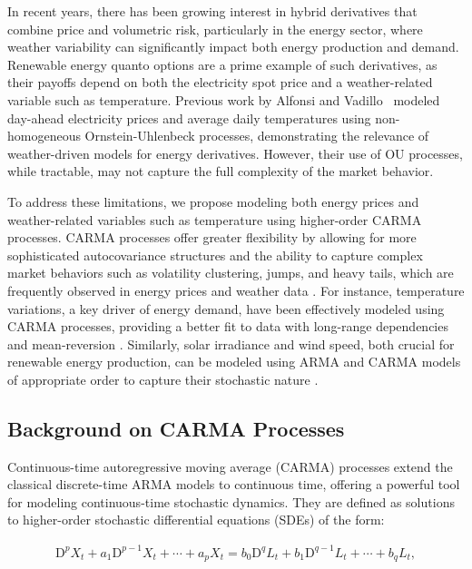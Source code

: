 \documentclass[10pt,a4paper,reqno]{amsart}
\theoremstyle{example}
\begin{document}
In recent years, there has been growing interest in hybrid derivatives that combine price and volumetric risk, particularly in the energy sector, where weather variability can significantly impact both energy production and demand. Renewable energy quanto options are a prime example of such derivatives, as their payoffs depend on both the electricity spot price and a weather-related variable such as temperature. Previous work by Alfonsi and Vadillo~\cite{AV24} modeled day-ahead electricity prices and average daily temperatures using non-homogeneous Ornstein-Uhlenbeck processes, demonstrating the relevance of weather-driven models for energy derivatives. However, their use of OU processes, while tractable, may not capture the full complexity of the market behavior.

To address these limitations, we propose modeling both energy prices and
weather-related variables such as temperature using higher-order CARMA
processes. CARMA processes offer greater flexibility by allowing for more
sophisticated autocovariance structures and the ability to capture complex
market behaviors such as volatility clustering, jumps, and heavy tails, which
are frequently observed in energy prices and weather data \cite{}. For instance, temperature
variations, a key driver of energy demand, have been effectively modeled using
CARMA processes, providing a better fit to data with long-range dependencies and
mean-reversion \cite{}. Similarly, solar
irradiance and wind speed, both crucial for renewable energy production, can be
modeled using ARMA and CARMA models of appropriate order to capture their
stochastic nature \cite{}.

\subsection{Background on CARMA Processes}

Continuous-time autoregressive moving average (CARMA) processes extend the classical discrete-time ARMA models to continuous time, offering a powerful tool for modeling continuous-time stochastic dynamics. They are defined as solutions to higher-order stochastic differential equations (SDEs) of the form:

\begin{align}\label{eq:CARMA-SDE}
\mathrm{D}^{p} X_{t} + a_{1} \mathrm{D}^{p-1} X_{t} + \cdots + a_{p} X_{t} = b_{0} \mathrm{D}^{q} L_{t} + b_{1} \mathrm{D}^{q-1} L_{t} + \cdots + b_{q} L_{t},
\end{align}
\end{document}
